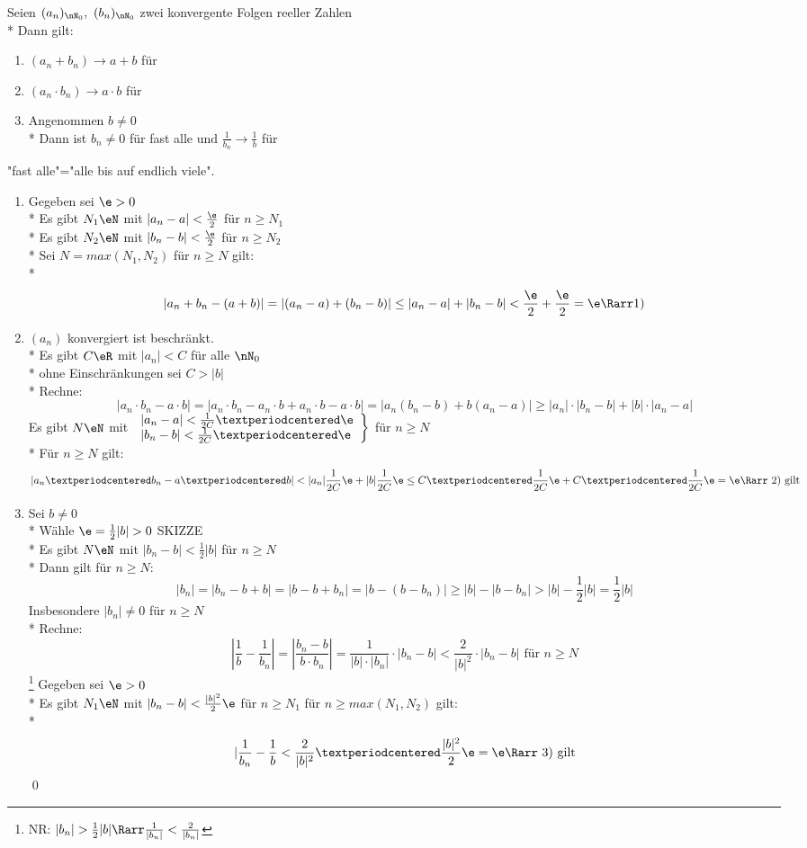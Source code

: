 Seien $(a_n)_{\nN_0},\ (b_n)_{\nN_0}$ zwei konvergente Folgen reeller Zahlen\\*
Dann gilt:
\begin{enumerate}
\item{$(a_n+b_n)→a+b$ für \nif}
\item{$(a_n·b_n)→a·b$ für \nif}
\item{Angenommen $b\neq 0$\\*
Dann ist $b_n\neq 0$ für fast alle \nN{} und $\frac{1}{b_n}→\frac{1}{b}$ für \nif}
\end{enumerate}
%
"fast alle"="alle bis auf endlich viele".
%
\bew
\begin{enumerate}
\item{Gegeben sei $\e>0$\\*
Es gibt $N_1\eN$ mit $|a_n-a|<\frac{\e}{2}$ für $n\geq N_1$\\*
Es gibt $N_2\eN$ mit $|b_n-b|<\frac{\e}{2}$ für $n\geq N_2$\\*
Sei $N=max(N_1,N_2)$ für $n\geq N$ gilt:\\*
$$|a_n+b_n-(a+b)|=|(a_n-a)+(b_n-b)|\leq |a_n-a|+|b_n-b|<\frac{\e}{2}+\frac{\e}{2}=\e \Rarr \text{1)}$$}
\item{$(a_n)$ konvergiert \Rarr{} ist beschränkt.\\*
Es gibt $C\eR$ mit $|a_n|<C$ für alle $\nN_0$\\*
ohne Einschränkungen sei $C>|b|$\\*
Rechne:
$$|a_n·b_n-a·b|=|a_n·b_n-a_n·b+a_n·b-a·b|=|a_n(b_n-b)+b(a_n-a)|\geq |a_n|·|b_n-b|+|b|·|a_n-a|$$
Es gibt $N\eN$ mit $\left.\begin{array}{l}|a_n-a|<\frac{1}{2C}·\e\\*|b_n-b|<\frac{1}{2C}·\e\end{array} \right\}$ für $n\geq N$\\*
Für $n\geq N$ gilt:
$$|a_n·b_n-a·b|<|a_n|\frac{1}{2C}\e+|b|\frac{1}{2C}\e\leq C·\frac{1}{2C}\e+C·\frac{1}{2C}\e=\e \Rarr \text{ 2) gilt}$$}
\item{Sei $b\neq 0$\\*
Wähle $\e=\frac{1}{2}|b|>0$ SKIZZE\\*
Es gibt $N\eN$ mit $|b_n-b|<\frac{1}{2}|b|$ für $n\geq N$\\*
Dann gilt für $n\geq N$:
$$|b_n|=|b_n-b+b|=|b-b+b_n|=|b-(b-b_n)|\geq |b|-|b-b_n|>|b|-\frac{1}{2}|b|=\frac{1}{2}|b|$$
Insbesondere $|b_n|\neq 0$ für $n\geq N$\\*
Rechne:
$$\left|\frac{1}{b}-\frac{1}{b_n}\right|=\left|\frac{b_n-b}{b·b_n}\right|=\frac{1}{|b|·|b_n|}·|b_n-b|<\frac{2}{|b|^2}·|b_n-b| \text{ für $n\geq N$}$$\footnote{NR: $|b_n|>\frac{1}{2}|b| \Rarr \frac{1}{|b_n|}<\frac{2}{|b_n|}$}
Gegeben sei $\e>0$\\*
Es gibt $N_1\eN$ mit $|b_n-b|<\frac{|b|^2}{2}\e$ für $n\geq N_1$\Rarr{} für $n\geq max(N_1,N_2)$ gilt:\\*
$$|\frac{1}{b_n}-\frac{1}{b}<\frac{2}{|b|^2}·\frac{|b|^2}{2}\e=\e \Rarr \text{ 3) gilt}$$\qed}
\end{enumerate}
